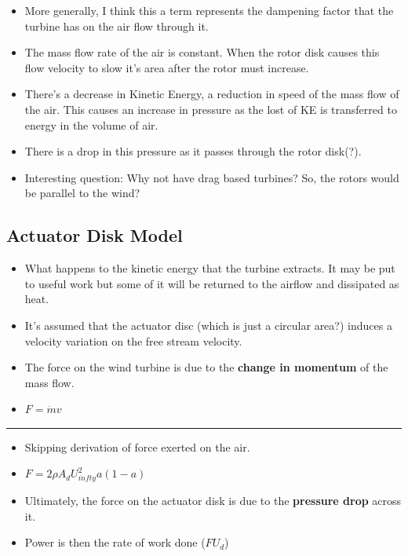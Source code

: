 \documentclass[11pt]{article}
\begin{document}
\begin{itemize}
\tightlist
\item
  More generally, I think this a term represents the dampening factor
  that the turbine has on the air flow through it.
\item
  The mass flow rate of the air is constant. When the rotor disk causes
  this flow velocity to slow it's area after the rotor must increase.
\item
  There's a decrease in Kinetic Energy, a reduction in speed of the mass
  flow of the air. This causes an increase in pressure as the lost of KE
  is transferred to energy in the volume of air.
\item
  There is a drop in this pressure as it passes through the rotor
  disk(?).
\item
  Interesting question: Why not have drag based turbines? So, the rotors
  would be parallel to the wind?
\end{itemize}

\hypertarget{actuator-disk-model}{%
\subsection{Actuator Disk Model}\label{actuator-disk-model}}

\begin{itemize}
\tightlist
\item
  What happens to the kinetic energy that the turbine extracts. It may
  be put to useful work but some of it will be returned to the airflow
  and dissipated as heat.
\item
  It's assumed that the actuator disc (which is just a circular area?)
  induces a velocity variation on the free stream velocity.
\item
  The force on the wind turbine is due to the \textbf{change in
  momentum} of the mass flow.
\item
  \(F = \dot{m}v\)
\end{itemize}

\begin{center}\rule{0.5\linewidth}{\linethickness}\end{center}

\begin{itemize}
\tightlist
\item
  Skipping derivation of force exerted on the air.
\item
  \(F = 2 \rho A_dU_{infty}^2a(1 - a)\)
\item
  Ultimately, the force on the actuator disk is due to the
  \textbf{pressure drop} across it.
\item
  Power is then the rate of work done (\(FU_d\))
\end{itemize}
\end{document}

